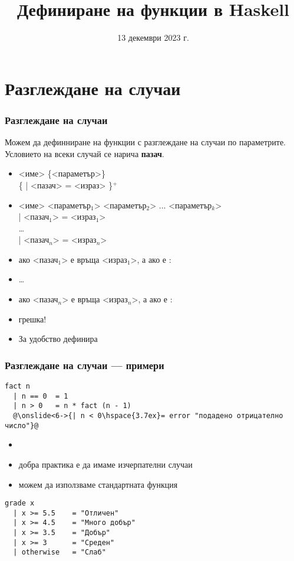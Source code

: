 \documentclass[alsotrans,beameroptions={aspectratio=169}]{beamerswitch}
\title{Дефиниране на функции в Haskell}
\date{13 декември 2023 г.}
\begin{document}
\begin{frame}
  \titlepage
\end{frame}

\section{Разглеждане на случаи}

\begin{frame}[fragile]
  \frametitle{Разглеждане на случаи}

  Можем да дефинниране на функции с разглеждане на случаи по параметрите.\\
  Условието на всеки случай се нарича \textbf{пазач}.
  \begin{itemize}
    \item{} <име> \{<параметър>\}\\
      \hspace{3ex} \{ \tta| <пазач> \tta= <израз> \}$^+$
      \pause
    \item{} <име> <параметър$_1$> <параметър$_2$> ... <параметър$_k$>\\
      \hspace{3ex} \tta| <пазач$_1$> \tta= <израз$_1$>\\
      \hspace{3ex} \ldots\\
      \hspace{3ex} \tta| <пазач$_n$> \tta= <израз$_n$>\\
      \pause
    \item ако <пазач$_1$> е  връща <израз$_1$>, а ако е :
    \item \ldots
    \item ако <пазач$_n$> е  връща <израз$_n$>, а ако е :
    \item \alert{грешка!}
      \pause
    \item За удобство  дефинира 
  \end{itemize}
\end{frame}

\begin{frame}[fragile]
  \frametitle{Разглеждане на случаи --- примери}

\begin{lstlisting}
fact n
  | n == 0  = 1
  | n > 0   = n * fact (n - 1)
  @\onslide<6->{| n < 0\hspace{3.7ex}= error "подадено отрицателно число"}@
\end{lstlisting}
\onslide<+->
\begin{itemize}[<+->]
\item {}
\item добра практика е да имаме изчерпателни случаи
\item можем да използваме стандартната функция 
\end{itemize}
\onslide<+->
\onslide<+->
\begin{lstlisting}
grade x
  | x >= 5.5    = "Отличен"
  | x >= 4.5    = "Много добър"
  | x >= 3.5    = "Добър"
  | x >= 3      = "Среден"
  | otherwise   = "Слаб"
\end{lstlisting}
\end{frame}
\end{document}

